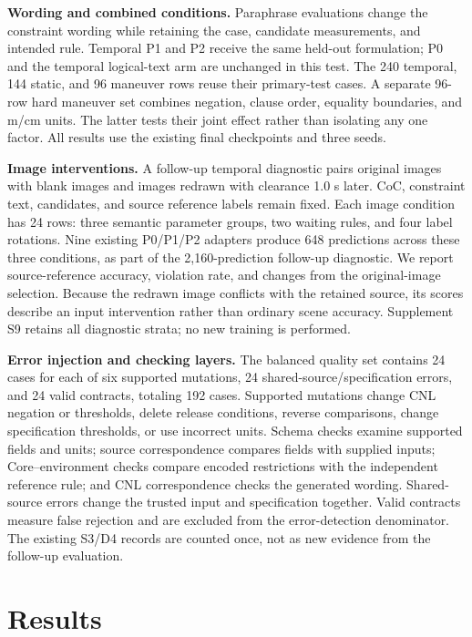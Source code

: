 \documentclass[nolineno]{ieeeaccess}
\begin{document}
\textbf{Wording and combined conditions.} Paraphrase evaluations change the constraint wording while retaining the case, candidate measurements, and intended rule. Temporal P1 and P2 receive the same held-out formulation; P0 and the temporal logical-text arm are unchanged in this test. The 240 temporal, 144 static, and 96 maneuver rows reuse their primary-test cases. A separate 96-row hard maneuver set combines negation, clause order, equality boundaries, and m/cm units. The latter tests their joint effect rather than isolating any one factor. All results use the existing final checkpoints and three seeds.\par

\textbf{Image interventions.} A follow-up temporal diagnostic pairs original images with blank images and images redrawn with clearance 1.0 s later. CoC, constraint text, candidates, and source reference labels remain fixed. Each image condition has 24 rows: three semantic parameter groups, two waiting rules, and four label rotations. Nine existing P0/P1/P2 adapters produce 648 predictions across these three conditions, as part of the 2,160-prediction follow-up diagnostic. We report source-reference accuracy, violation rate, and changes from the original-image selection. Because the redrawn image conflicts with the retained source, its scores describe an input intervention rather than ordinary scene accuracy. Supplement S9 retains all diagnostic strata; no new training is performed.\par

\textbf{Error injection and checking layers.} The balanced quality set contains 24 cases for each of six supported mutations, 24 shared-source/specification errors, and 24 valid contracts, totaling 192 cases. Supported mutations change CNL negation or thresholds, delete release conditions, reverse comparisons, change specification thresholds, or use incorrect units. Schema checks examine supported fields and units; source correspondence compares fields with supplied inputs; Core--environment checks compare encoded restrictions with the independent reference rule; and CNL correspondence checks the generated wording. Shared-source errors change the trusted input and specification together. Valid contracts measure false rejection and are excluded from the error-detection denominator. The existing S3/D4 records are counted once, not as new evidence from the follow-up evaluation.\par

\section{Results}
\end{document}
